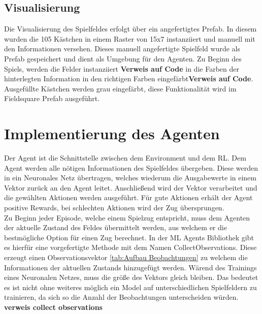 \subsection{Visualisierung}
Die Visualisierung des Spielfeldes erfolgt über ein angefertigtes Prefab. In diesem wurden die 105 Kästchen in einem Raster von 15x7 instanziiert und manuell mit den Informationen versehen. Dieses manuell angefertigte Spielfeld wurde als Prefab gespeichert und dient als Umgebung für den Agenten.
Zu Beginn des Spiels, werden die Felder instanziiert \textbf{Verweis auf Code} in die Farben der hinterlegten Information in den richtigen Farben eingefärbt\textbf{Verweis auf Code}. Ausgefüllte Kästchen werden grau eingefärbt, diese Funktionalität wird im Fieldsquare Prefab ausgeführt.


\section{Implementierung des Agenten}
Der Agent ist die Schnittstelle zwischen dem Environment und dem RL.
Dem Agent werden alle nötigen Informationen des Spielfeldes übergeben. Diese werden in ein Neuronales Netz übertragen, welches wiederum die Ausgabewerte in einem Vektor zurück an den Agent leitet.
Anschließend wird der Vektor verarbeitet und die gewählten Aktionen werden ausgeführt.
Für gute Aktionen erhält der Agent positive Rewards, bei schlechten Aktionen wird der Zug übersprungen. \\
Zu Beginn jeder Episode, welche einem Spielzug entspricht, muss dem Agenten der aktuelle Zustand des Feldes übermittelt werden, aus welchem er die bestmögliche Option für einen Zug berechnet. In der ML Agents Bibliothek gibt es hierfür eine vorgefertigte Methode mit dem Namen CollectObservations. Diese erzeugt einen Observationsvektor \ref{tab:Aufbau Beobachtungen} zu welchem die Informationen der aktuellen Zustands hinzugefügt werden.
Wärend des Trainings eines Neuronalen Netzes, muss die größe des Vektors gleich bleiben. Das bedeutet es ist nicht ohne weiteres möglich ein Model auf unterschiedlichen Spielfeldern zu trainieren, da sich so die Anzahl der Beobachtungen unterscheiden würden.
\textbf{verweis collect observations}

